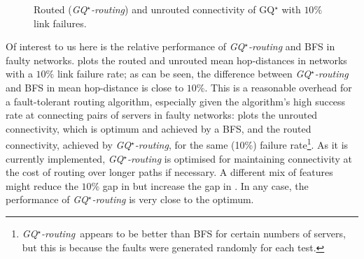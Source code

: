 \documentclass[]{amsart}
\begin{document}
{\begin{figure}[ht]
{

}
\caption{Routed (\emph{GQ$^\star$-routing\/}) and unrouted connectivity of GQ$^\star$
  with $10\%$ link failures.}
\label{plot:bfs_vs_routing_connectivity_P_0.1}
\end{figure}

Of interest to us here is the relative performance of \emph{GQ$^\star$-routing\/}
and BFS in faulty networks.  
plots the routed and unrouted mean hop-distances in networks with a
$10\%$ link failure rate; as can be seen, the difference between \emph{GQ$^\star$-routing\/}
and BFS in mean hop-distance is close to $10\%$.  This is a reasonable
overhead for a fault-tolerant routing algorithm, especially given the algorithm's
high success rate at connecting pairs of servers in faulty networks: 
 plots the unrouted
connectivity, which is optimum and achieved by a BFS, and the routed
connectivity, achieved by \emph{GQ$^\star$-routing\/}, for the same (10\%) failure
rate\footnote{\emph{GQ$^\star$-routing\/}~appears to be better than BFS for certain
  numbers of servers, but this is because the faults were generated
  randomly for each test.}.  As it is currently implemented, \emph{GQ$^\star$-routing\/} is
optimised for maintaining connectivity at the cost of routing over
longer paths if necessary.  A different mix of features might reduce the
$10\%$ gap in  but increase the
gap in .  In any
case, the performance of \emph{GQ$^\star$-routing\/} is very close to the optimum.












}
\end{document}

